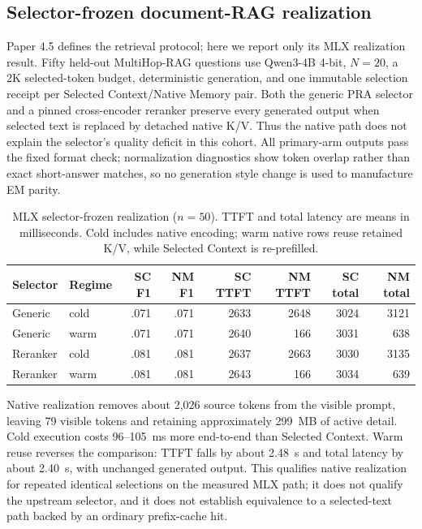 \documentclass[10pt]{article}
\begin{document}
\subsection{Selector-frozen document-RAG realization}

Paper 4.5 defines the retrieval protocol; here we report only its MLX
realization result. Fifty held-out MultiHop-RAG questions use Qwen3-4B 4-bit,
$N=20$, a 2K selected-token budget, deterministic generation, and one immutable
selection receipt per Selected Context/Native Memory pair. Both the generic
PRA selector and a pinned cross-encoder reranker preserve every generated
output when selected text is replaced by detached native K/V. Thus the native
path does not explain the selector's quality deficit in this cohort.
All primary-arm outputs pass the fixed format check; normalization diagnostics
show token overlap rather than exact short-answer matches, so no generation
style change is used to manufacture EM parity.

\begin{table}[H]
\centering
\small
\caption{MLX selector-frozen realization ($n=50$). TTFT and total latency are
means in milliseconds. Cold includes native encoding; warm native rows reuse
retained K/V, while Selected Context is re-prefilled.}
\label{tab:mlx-powered-rag}
\begin{tabular}{llrrrrrr}
\toprule
Selector & Regime & SC F1 & NM F1 & SC TTFT & NM TTFT & SC total & NM total \\
\midrule
Generic & cold & .071 & .071 & 2633 & 2648 & 3024 & 3121 \\
Generic & warm & .071 & .071 & 2640 & 166 & 3031 & 638 \\
Reranker & cold & .081 & .081 & 2637 & 2663 & 3030 & 3135 \\
Reranker & warm & .081 & .081 & 2643 & 166 & 3034 & 639 \\
\bottomrule
\end{tabular}
\end{table}

Native realization removes about 2,026 source tokens from the visible prompt,
leaving 79 visible tokens and retaining approximately 299~MB of active detail.
Cold execution costs 96--105~ms more end-to-end than Selected Context. Warm
reuse reverses the comparison: TTFT falls by about 2.48~s and total latency by
about 2.40~s, with unchanged generated output. This qualifies native
realization for repeated identical selections on the measured MLX path; it
does not qualify the upstream selector, and it does not establish equivalence
to a selected-text path backed by an ordinary prefix-cache hit.
\end{document}

